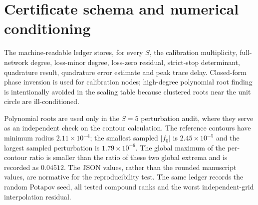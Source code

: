 \documentclass[11pt]{article}
\theoremstyle{definition}
\theoremstyle{remark}
\begin{document}
\section{Certificate schema and numerical conditioning}

The machine-readable ledger stores, for every $S$, the calibration
multiplicity, full-network degree, loss-minor degree, loss-zero residual,
strict-stop determinant, quadrature result, quadrature error estimate and
peak trace delay.  Closed-form phase inversion is used for calibration nodes;
high-degree polynomial root finding is intentionally avoided in the scaling
table because clustered roots near the unit circle are ill-conditioned.

Polynomial roots are used only in the $S=5$ perturbation audit, where they
serve as an independent check on the contour calculation.  The reference
contours have minimum radius $2.11\times10^{-4}$; the smallest sampled
$|f_0|$ is $2.45\times10^{-5}$ and the largest sampled perturbation is
$1.79\times10^{-6}$.  The global maximum of the per-contour ratio is smaller
than the ratio of these two global extrema and is recorded as $0.04512$.
The JSON values, rather than the rounded manuscript values, are normative for
the reproducibility test.
The same ledger records the random Potapov seed, all tested compound ranks and
the worst independent-grid interpolation residual.



\end{document}

